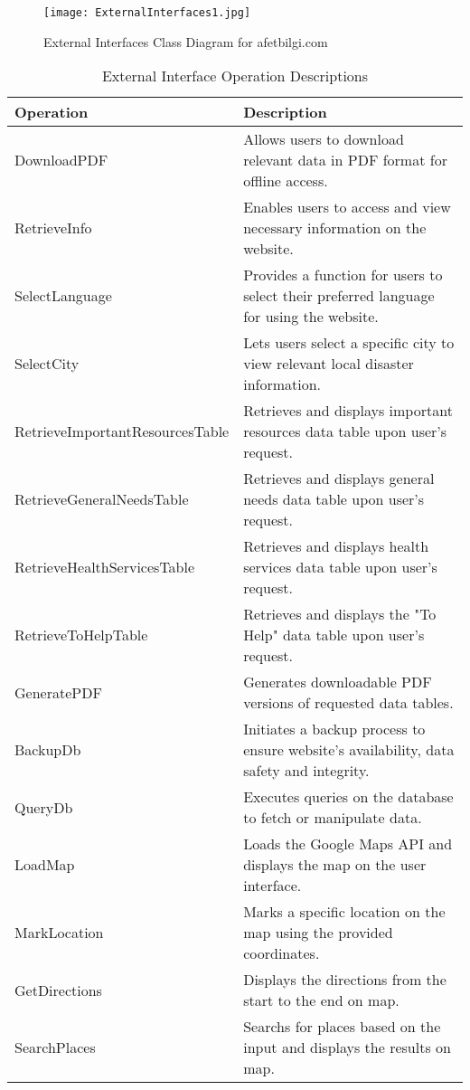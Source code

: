 \documentclass[12pt, letterpaper]{article}
\begin{document}
\begin{figure}[H] %
\centering 
\texttt{[image: ExternalInterfaces1.jpg]}
\caption{External Interfaces Class Diagram for afetbilgi.com}
\end{figure}

\begin{table}[H]
    \centering
    \begin{tabular}{|l|p{10cm}|}
        \hline
        \textbf{Operation} & \textbf{Description} \\
        \hline %
        DownloadPDF & Allows users to download relevant data in PDF format for offline access. \\
        \hline %
        RetrieveInfo & Enables users to access and view necessary information on the website. \\
        \hline %
        SelectLanguage & Provides a function for users to select their preferred language for using the website. \\
        \hline %
        SelectCity & Lets users select a specific city to view relevant local disaster information. \\
        \hline %
        RetrieveImportantResourcesTable & Retrieves and displays important resources data table upon user's request. \\
        \hline %
        RetrieveGeneralNeedsTable & Retrieves and displays general needs data table upon user's request. \\
        \hline %
        RetrieveHealthServicesTable & Retrieves and displays health services data table upon user's request. \\
        \hline %
        RetrieveToHelpTable & Retrieves and displays the "To Help" data table upon user's request. \\
        \hline %
        GeneratePDF & Generates downloadable PDF versions of requested data tables. \\
        \hline %
        BackupDb & Initiates a backup process to ensure website's availability, data safety and integrity. \\
        \hline %
        QueryDb & Executes queries on the database to fetch or manipulate data. \\
        \hline %
        LoadMap & Loads the Google Maps API and displays the map on the user interface. \\
        \hline %
        MarkLocation & Marks a specific location on the map using the provided coordinates. \\
        \hline %
        GetDirections & Displays the directions from the start to the end on map. \\
        \hline %
        SearchPlaces & Searchs for places based on the input and displays the results on map. \\
        \hline
    \end{tabular}
    \caption{External Interface Operation Descriptions}
    \label{tab:operations}
\end{table}
\end{document}
